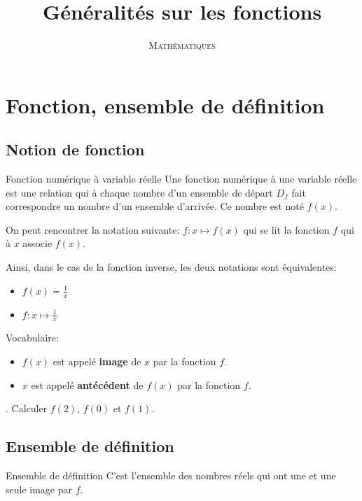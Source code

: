 \documentclass[a4paper,12pt]{scrartcl}
\date{}
\title{Généralités sur les fonctions}
\author{\textsc{Mathématiques}}
\begin{document}
\maketitle

\tableofcontents

\section{Fonction, ensemble de définition}

\subsection{Notion de fonction}\label{definition}

\begin{definition}{Fonction numérique à variable réelle}
Une fonction numérique à une variable réelle est une relation qui à chaque nombre d'un ensemble de départ $D_f$ fait correspondre un nombre d'un ensemble d'arrivée. Ce nombre est noté $f(x)$.
\end{definition}


On peut rencontrer la notation suivante: $f:x \longmapsto f(x)$ qui se lit \og{} la fonction $f$ qui à $x$ associe $f(x)$\fg{}.

Ainsi, dans le cas de la fonction inverse, les deux notations sont équivalentes:
\begin{itemize}
    \item $f(x) = \frac{1}{x}$
    \item $f:x \longmapsto \frac{1}{x}$
\end{itemize}

Vocabulaire:

\begin{itemize}
    \item $f(x)$ est appelé \textbf{image} de $x$ par la fonction $f$.
    \item $x$ est appelé \textbf{antécédent} de $f(x)$ par la fonction $f$.
\end{itemize}

. Calculer $f(2)$, $f(0)$ et $f(1)$. 


\subsection{Ensemble de définition}

\begin{definition}{Ensemble de définition}
C'est l'ensemble des nombres réels qui ont une et une seule image par $f$.
\end{definition}
\end{document}
